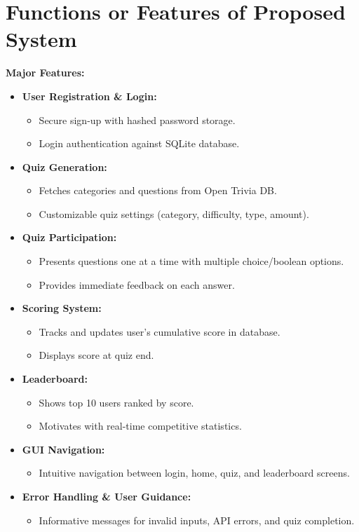 \documentclass[12pt,a4paper]{article}
\begin{document}
\section{Functions or Features of Proposed System}

\textbf{Major Features:}
\begin{itemize}
    \item \textbf{User Registration \& Login:}
    \begin{itemize}
        \item Secure sign-up with hashed password storage.
        \item Login authentication against SQLite database.
    \end{itemize}
    \item \textbf{Quiz Generation:}
    \begin{itemize}
        \item Fetches categories and questions from Open Trivia DB.
        \item Customizable quiz settings (category, difficulty, type, amount).
    \end{itemize}
    \item \textbf{Quiz Participation:}
    \begin{itemize}
        \item Presents questions one at a time with multiple choice/boolean options.
        \item Provides immediate feedback on each answer.
    \end{itemize}
    \item \textbf{Scoring System:}
    \begin{itemize}
        \item Tracks and updates user's cumulative score in database.
        \item Displays score at quiz end.
    \end{itemize}
    \item \textbf{Leaderboard:}
    \begin{itemize}
        \item Shows top 10 users ranked by score.
        \item Motivates with real-time competitive statistics.
    \end{itemize}
    \item \textbf{GUI Navigation:}
    \begin{itemize}
        \item Intuitive navigation between login, home, quiz, and leaderboard screens.
    \end{itemize}
    \item \textbf{Error Handling \& User Guidance:}
    \begin{itemize}
        \item Informative messages for invalid inputs, API errors, and quiz completion.
    \end{itemize}
\end{itemize}
\end{document}
